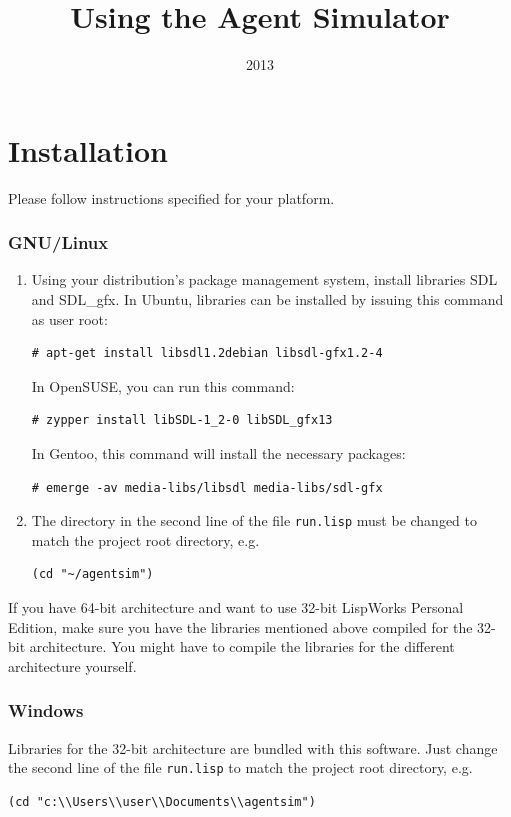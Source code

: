\documentclass[a4paper,12pt]{article}
\title{Using the Agent Simulator}
\author{}
\date{2013}
\begin{document}
\maketitle

\section*{Installation}

Please follow instructions specified for your platform.

\subsubsection*{GNU/Linux}

\begin{enumerate}
\item Using your distribution's package management system, install libraries SDL and SDL\_gfx.
In Ubuntu, libraries can be installed by issuing this command as user root:
\begin{verbatim}
# apt-get install libsdl1.2debian libsdl-gfx1.2-4
\end{verbatim}
In OpenSUSE, you can run this command:
\begin{verbatim}
# zypper install libSDL-1_2-0 libSDL_gfx13
\end{verbatim}
In Gentoo, this command will install the necessary packages:
\begin{verbatim}
# emerge -av media-libs/libsdl media-libs/sdl-gfx
\end{verbatim}

\item The directory in the second line of the file \texttt{run.lisp} must be changed to match the project root directory, e.g.
\begin{verbatim}
(cd "~/agentsim")
\end{verbatim}
\end{enumerate}

If you have 64-bit architecture and want to use 32-bit LispWorks Personal Edition, make sure you have the
libraries mentioned above compiled for the 32-bit architecture. You might have to compile the libraries for the
different architecture yourself.

\subsubsection*{Windows}
Libraries for the 32-bit architecture are bundled with this software. Just change the second line of the file
\texttt{run.lisp} to match the project root directory, e.g.
\begin{verbatim}
(cd "c:\\Users\\user\\Documents\\agentsim")
\end{verbatim}
\end{document}
